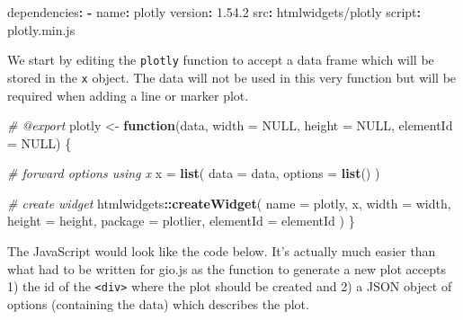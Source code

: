 \documentclass[
]{krantz}
\makeatletter
\newenvironment{Shaded}{\begin{snugshade}}{\end{snugshade}}
\newcommand{\AttributeTok}[1]{\textcolor[rgb]{0.61,0.61,0.61}{#1}}
\newcommand{\CommentTok}[1]{\textcolor[rgb]{0.37,0.37,0.37}{\textit{#1}}}
\newcommand{\ControlFlowTok}[1]{\textcolor[rgb]{0.27,0.27,0.27}{\textbf{#1}}}
\newcommand{\DataTypeTok}[1]{\textcolor[rgb]{0.27,0.27,0.27}{#1}}
\newcommand{\FloatTok}[1]{\textcolor[rgb]{0.06,0.06,0.06}{#1}}
\newcommand{\FunctionTok}[1]{\textcolor[rgb]{0,0,0}{#1}}
\newcommand{\KeywordTok}[1]{\textcolor[rgb]{0.27,0.27,0.27}{\textbf{#1}}}
\newcommand{\NormalTok}[1]{#1}
\newcommand{\OperatorTok}[1]{\textcolor[rgb]{0.43,0.43,0.43}{\textbf{#1}}}
\newcommand{\OtherTok}[1]{\textcolor[rgb]{0.37,0.37,0.37}{#1}}
\newcommand{\StringTok}[1]{\textcolor[rgb]{0.5,0.5,0.5}{#1}}
\newenvironment{kframe}{%
\medskip{}
\setlength{\fboxsep}{.8em}
 \def\at@end@of@kframe{}%
 \ifinner\ifhmode%
  \def\at@end@of@kframe{\end{minipage}}%
  \begin{minipage}{\columnwidth}%
 \fi\fi%
 \def\FrameCommand##1{\hskip\@totalleftmargin \hskip-\fboxsep
 \colorbox{shadecolor}{##1}\hskip-\fboxsep
     \hskip-\linewidth \hskip-\@totalleftmargin \hskip\columnwidth}%
 \MakeFramed {\advance\hsize-\width
   \@totalleftmargin\z@ \linewidth\hsize
   \@setminipage}}%
 {\par\unskip\endMakeFramed%
 \at@end@of@kframe}
\renewenvironment{Shaded}{\begin{kframe}}{\end{kframe}}
\makeatother
\begin{document}
\begin{Shaded}
\begin{Highlighting}[]
\FunctionTok{dependencies}\KeywordTok{:}
\AttributeTok{ }\KeywordTok{{-}}\AttributeTok{ }\FunctionTok{name}\KeywordTok{:}\AttributeTok{ plotly}
\AttributeTok{   }\FunctionTok{version}\KeywordTok{:}\AttributeTok{ }\FloatTok{1.54.2}
\AttributeTok{   }\FunctionTok{src}\KeywordTok{:}\AttributeTok{ htmlwidgets/plotly}
\AttributeTok{   }\FunctionTok{script}\KeywordTok{:}\AttributeTok{ plotly.min.js}
\end{Highlighting}
\end{Shaded}

We start by editing the \texttt{plotly} function to accept a data frame which will be stored in the \texttt{x} object. The data will not be used in this very function but will be required when adding a line or marker plot.

\begin{Shaded}
\begin{Highlighting}[]
\CommentTok{\#\textquotesingle{} @export}
\NormalTok{plotly \textless{}{-}}\StringTok{ }\ControlFlowTok{function}\NormalTok{(data, }\DataTypeTok{width =} \OtherTok{NULL}\NormalTok{, }\DataTypeTok{height =} \OtherTok{NULL}\NormalTok{, }
  \DataTypeTok{elementId =} \OtherTok{NULL}\NormalTok{) \{}

  \CommentTok{\# forward options using x}
\NormalTok{  x =}\StringTok{ }\KeywordTok{list}\NormalTok{(}
    \DataTypeTok{data =}\NormalTok{ data,}
    \DataTypeTok{options =} \KeywordTok{list}\NormalTok{()}
\NormalTok{  )}

  \CommentTok{\# create widget}
\NormalTok{  htmlwidgets}\OperatorTok{::}\KeywordTok{createWidget}\NormalTok{(}
    \DataTypeTok{name =} \StringTok{\textquotesingle{}plotly\textquotesingle{}}\NormalTok{,}
\NormalTok{    x,}
    \DataTypeTok{width =}\NormalTok{ width,}
    \DataTypeTok{height =}\NormalTok{ height,}
    \DataTypeTok{package =} \StringTok{\textquotesingle{}plotlier\textquotesingle{}}\NormalTok{,}
    \DataTypeTok{elementId =}\NormalTok{ elementId}
\NormalTok{  )}
\NormalTok{\}}
\end{Highlighting}
\end{Shaded}

The JavaScript would look like the code below. It's actually much easier than what had to be written for gio.js as the function to generate a new plot accepts 1) the id of the \texttt{\textless{}div\textgreater{}} where the plot should be created and 2) a JSON object of options (containing the data) which describes the plot.
\end{document}
